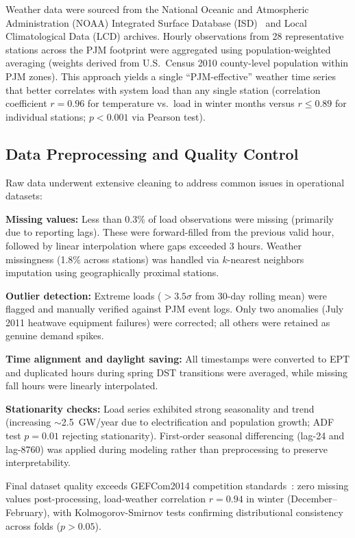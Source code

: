 \documentclass[12pt,a4paper]{article}
\begin{document}
Weather data were sourced from the National Oceanic and Atmospheric Administration (NOAA) Integrated Surface Database (ISD)~\cite{watson2023quantifying} and Local Climatological Data (LCD) archives. Hourly observations from 28 representative stations across the PJM footprint were aggregated using population-weighted averaging (weights derived from U.S.\ Census 2010 county-level population within PJM zones). This approach yields a single ``PJM-effective'' weather time series that better correlates with system load than any single station (correlation coefficient $r = 0.96$ for temperature vs.\ load in winter months versus $r \leq 0.89$ for individual stations; $p < 0.001$ via Pearson test).

\subsection{Data Preprocessing and Quality Control}

Raw data underwent extensive cleaning to address common issues in operational datasets:

\textbf{Missing values:} Less than 0.3\% of load observations were missing (primarily due to reporting lags). These were forward-filled from the previous valid hour, followed by linear interpolation where gaps exceeded 3 hours. Weather missingness (1.8\% across stations) was handled via $k$-nearest neighbors imputation using geographically proximal stations.

\textbf{Outlier detection:} Extreme loads ($>3.5\sigma$ from 30-day rolling mean) were flagged and manually verified against PJM event logs. Only two anomalies (July 2011 heatwave equipment failures) were corrected; all others were retained as genuine demand spikes.

\textbf{Time alignment and daylight saving:} All timestamps were converted to EPT and duplicated hours during spring DST transitions were averaged, while missing fall hours were linearly interpolated.

\textbf{Stationarity checks:} Load series exhibited strong seasonality and trend (increasing $\sim$2.5~GW/year due to electrification and population growth; ADF test $p=0.01$ rejecting stationarity). First-order seasonal differencing (lag-24 and lag-8760) was applied during modeling rather than preprocessing to preserve interpretability.

Final dataset quality exceeds GEFCom2014 competition standards~\cite{panteli2015influence}: zero missing values post-processing, load-weather correlation $r = 0.94$ in winter (December--February), with Kolmogorov-Smirnov tests confirming distributional consistency across folds ($p > 0.05$).
\end{document}
